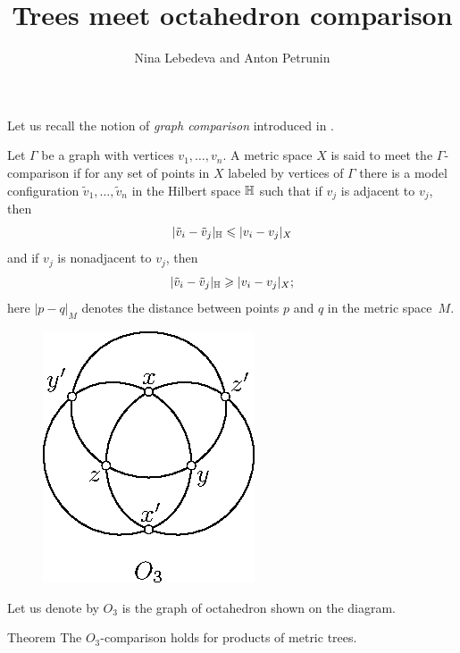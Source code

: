 \documentclass{article}
\begin{document}


\title{Trees meet octahedron comparison}
\author{Nina Lebedeva and Anton Petrunin}

\date{}
\maketitle

Let us recall the notion of \emph{graph comparison} introduced in \cite{lebedeva-petrunin-zolotov}.

Let $\Gamma$ be a graph with vertices $v_1,\dots,v_n$.
A metric space $X$ is said to meet the $\Gamma$-comparison if for any set of points in $X$ labeled by vertices of $\Gamma$ there is a model configuration $\tilde v_1,\dots,\tilde v_n$ in the Hilbert space $\mathbb H$ such that 
if $v_j$ is adjacent to $v_j$, then
\[|\tilde v_i-\tilde v_j|_{\mathbb H}\leqslant | v_i-v_j|_{X}\]
and
if $v_j$ is nonadjacent to $v_j$, then
\[|\tilde v_i-\tilde v_j|_{\mathbb H}\geqslant | v_i-v_j|_{X};\]
here $|p-q|_M$ denotes the distance between points $p$ and $q$ in the metric space~$M$.

\begin{figure}
\vskip-2mm
\centering
\includegraphics{mppics/pic-30}
\end{figure}

Let us denote by $O_3$ is the graph of octahedron shown on the diagram.

\begin{thm}{Theorem}
The $O_3$-comparison holds for products of metric trees.
\end{thm}
\end{document}
